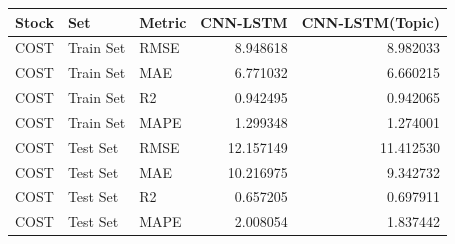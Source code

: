 \begin{tabular}{lllrr}
\toprule
Stock & Set & Metric & CNN-LSTM & CNN-LSTM(Topic) \\
\midrule
COST & Train Set & RMSE & 8.948618 & 8.982033 \\
COST & Train Set & MAE & 6.771032 & 6.660215 \\
COST & Train Set & R2 & 0.942495 & 0.942065 \\
COST & Train Set & MAPE & 1.299348 & 1.274001 \\
COST & Test Set & RMSE & 12.157149 & 11.412530 \\
COST & Test Set & MAE & 10.216975 & 9.342732 \\
COST & Test Set & R2 & 0.657205 & 0.697911 \\
COST & Test Set & MAPE & 2.008054 & 1.837442 \\
\bottomrule
\end{tabular}
